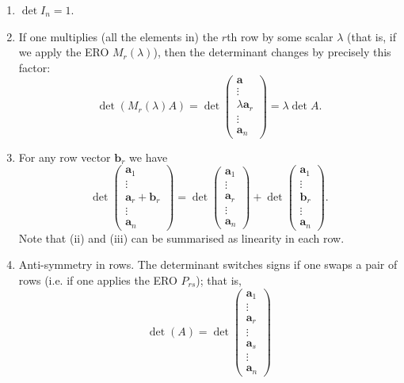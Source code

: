 \documentclass[10pt, a4paper]{article}
\newcommand{\mbf}[1]{\mathbf{#1}}
\begin{document}
\begin{enumerate}[label = (\roman*)]
    \item $\det I_n = 1$.
    \item If one multiplies
    (all the elements in)
    the $r$th row by some scalar $\lambda$
    (that is, if we apply the ERO $M_r(\lambda)$),
    then the determinant changes by precisely this factor:
    \[
    \det(M_r(\lambda)A) = \det\begin{pmatrix}
        \mbf{a} \\ \vdots \\ \lambda\mbf{a}_r \\ \vdots \\ \mbf{a}_n
    \end{pmatrix} = \lambda\det A.
    \]
    \item For any row vector $\mbf{b}_r$ we have
    \[
    \det\begin{pmatrix}
        \mbf{a}_1 \\ \vdots \\ \mbf{a}_r + \mbf{b}_r \\ \vdots \\ \mbf{a}_n
    \end{pmatrix} =
    \det \begin{pmatrix}
        \mbf{a}_1 \\ \vdots \\ \mbf{a}_r \\ \vdots \\ \mbf{a}_n
    \end{pmatrix}
    +
    \det\begin{pmatrix}
        \mbf{a}_1 \\ \vdots \\ \mbf{b}_r \\ \vdots \\ \mbf{a}_n
    \end{pmatrix}.
    \]
    Note that (ii) and (iii) can be summarised as linearity in each row.
    \item Anti-symmetry in rows.
    The determinant switches signs if one swaps a pair of rows (i.e. if one applies the ERO $P_{rs}$);
    that is,
    \[
    \det(A) = \det\begin{pmatrix}
        \mbf{a}_1 \\ \vdots \\ \mbf{a}_r \\ \vdots \\ \mbf{a}_s \\ \vdots \\ \mbf{a}_n

\end{pmatrix}\]
\end{enumerate}
\end{document}
